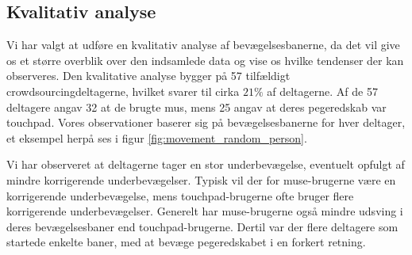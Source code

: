 \subsection*{Kvalitativ analyse}
Vi har valgt at udføre en kvalitativ analyse af bevægelsesbanerne, da det vil give os et større overblik over den indsamlede data og vise os hvilke tendenser der kan observeres.
Den kvalitative analyse bygger på 57 tilfældigt crowdsourcingdeltagerne, hvilket svarer til cirka $21\%$ af deltagerne. Af de 57 deltagere angav 32 at de brugte mus, mens 25 angav at deres pegeredskab var touchpad. Vores observationer baserer sig på bevægelsesbanerne for hver deltager, et eksempel herpå ses i figur \ref{fig:movement_random_person}.

Vi har observeret at deltagerne tager en stor underbevægelse, eventuelt opfulgt af mindre korrigerende underbevægelser. Typisk vil der for muse-brugerne være en korrigerende underbevægelse, mens touchpad-brugerne ofte bruger flere korrigerende underbevægelser. Generelt har muse-brugerne også mindre udsving i deres bevægelsesbaner end touchpad-brugerne. Dertil var der flere deltagere som startede enkelte baner, med at bevæge pegeredskabet i en forkert retning.

